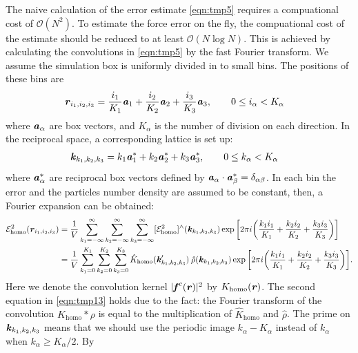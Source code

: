 \documentclass[aps,pre,preprint]{revtex4}
\renewcommand{\v}[1]{\textbf{\textit{#1}}}
\begin{document}
The naive calculation of the error estimate \eqref{eqn:tmp5} requires
a compuational cost of $\mathcal O(N^2)$. To estimate the force error
on the fly, the compuational cost of the estimate should be reduced to
at least $\mathcal O(N\log N)$.  This is achieved by calculating the
convolutions in \eqref{eqn:tmp5} by the fast Fourier transform. We
assume the simulation box is uniformly divided in to small bins.  The
positions of these bins are
\begin{align}
  \v r_{i_1, i_2, i_3} & =
  \frac{i_1}{K_1}\v a_1 + 
  \frac{i_2}{K_2}\v a_2 + 
  \frac{i_3}{K_3}\v a_3,\qquad 0\leq i_\alpha< K_\alpha
\end{align}
where $\v a_\alpha$ are box vectors, and $K_\alpha$ is the number of
division on each direction. In the reciprocal space, a corresponding
lattice is set up:
\begin{align}
  \v k_{k_1, k_2, k_3} & =
  k_1\v a_1^\ast +
  k_2\v a_2^\ast +
  k_3\v a_3^\ast, \qquad 0\leq k_\alpha<K_\alpha
\end{align}
where $\v a_\alpha^\ast$ are reciprocal box vectors defined by $\v
a_\alpha\cdot\v a_\beta^\ast = \delta_{\alpha\beta}$.  In each bin the
error and the particles number density are assumed to be constant,
then, a Fourier expansion can be obtained:
\begin{align}\nonumber
  \mathcal E^2_{\textrm{homo}}(\v r_{i_1,i_2,i_3})
  & =
  \frac1V\sum_{k_1=-\infty}^\infty\sum_{k_2=-\infty}^\infty\sum_{k_3=-\infty}^\infty
  [{\mathcal E}^2_{\textrm{homo}}]^{\wedge}(\v k_{k_1,k_2,k_3})
  \exp\bigg[
  2\pi i\bigg(
  \frac{k_1i_1}{K_1} + \frac{k_2i_2}{K_2} + \frac{k_3i_3}{K_3}
  \bigg)
  \bigg] \\\label{eqn:tmp13}
  & =
  \frac1V\sum_{k_1=0}^{K_1}\sum_{k_2=0}^{K_2}\sum_{k_3=0}^{K_3}
  \hat{K}_{\textrm{homo}}(\v k'_{k_1,k_2,k_3})\:
  \hat{\rho}(\v k_{k_1,k_2,k_3})
  \exp\bigg[
  2\pi i\bigg(
  \frac{k_1i_1}{K_1} + \frac{k_2i_2}{K_2} + \frac{k_3i_3}{K_3}
  \bigg)
  \bigg].
\end{align}
Here we denote the convolution kernel $\vert\v f^c(\v r)\vert^2$ by
$K_{\textrm{homo}}(\v r)$.  The second equation in \eqref{eqn:tmp13}
holds due to the fact: the Fourier transform of the convolution
$K_{\textrm{homo}}\ast\rho$ is equal to the multiplication of
$\hat{K}_{\textrm{homo}}$ and $\hat\rho$.  The prime on $\v
k_{k_1,k_2,k_3}$ means that we should use the periodic image $k_\alpha
- K_\alpha$ instead of $k_\alpha$ when $k_\alpha \geq K_\alpha/2$. By
\end{document}
